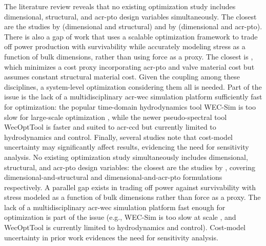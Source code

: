     \ifdefined\DISSERTATION
    The literature review reveals that no existing optimization study includes dimensional, structural, and \gls{acr-pto} design variables simultaneously.
    The closest are the studies by \citet{ambuhl_reliability-based_2014} (dimensional and structural) and by \citet{grasberger_control_2024} (dimensional and \gls{acr-pto}).
    There is also a gap of work that uses a scalable optimization framework to trade off power production with survivability while accurately modeling stress as a function of bulk dimensions, rather than using force as a proxy.
    The closest is \citet{rosati_control_2023}, which minimizes a cost proxy incorporating \gls{acr-pto} and valve material cost but assumes constant structural material cost.
    Given the coupling among these disciplines, a system-level optimization considering them all is needed.
    Part of the issue is the lack of a multidisciplinary \gls{acr-wec} simulation platform sufficiently fast for optimization: the popular time-domain hydrodynamics tool WEC-Sim \citep{ruehl_wec-simwec-sim_2024} is too slow for large-scale optimization \citep{housner_numerical_2024}, while the newer pseudo-spectral tool WecOptTool \citep{coe_initial_2020} is faster and suited to \gls{acr-ccd} but currently limited to hydrodynamics and control.
    Finally, several studies note that cost-model uncertainty may significantly affect results, evidencing the need for sensitivity analysis.
\else
    No existing optimization study simultaneously includes dimensional, structural, and \gls{acr-pto} design variables: the closest are the studies by \citet{ambuhl_reliability-based_2014,grasberger_control_2024}, covering dimensional-and-structural and dimensional-and-\gls{acr-pto} formulations respectively.
    A parallel gap exists in trading off power against survivability with stress modeled as a function of bulk dimensions rather than force as a proxy.
    The lack of a multidisciplinary \gls{acr-wec} simulation platform fast enough for optimization is part of the issue (e.g., WEC-Sim \citep{ruehl_wec-simwec-sim_2024} is too slow at scale \citep{housner_numerical_2024}, and WecOptTool \citep{coe_initial_2020} is currently limited to hydrodynamics and control).
    Cost-model uncertainty in prior work \citep{mccabe_multidisciplinary_2022} evidences the need for sensitivity analysis.
\fi


